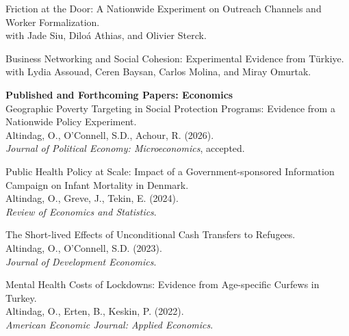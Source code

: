 \documentclass[12pt]{article}
\newcommand{\papertitle}[1]{#1} %
\begin{document}
\smallskip
\noindent\begin{minipage}{\linewidth}
\papertitle{Friction at the Door: A Nationwide Experiment on Outreach Channels and Worker Formalization.} \\
with Jade Siu, Dilo\'{a} Athias, and Olivier Sterck.
\end{minipage}

\smallskip
\noindent\begin{minipage}{\linewidth}
\papertitle{Business Networking and Social Cohesion: Experimental Evidence from T\"{u}rkiye.} \\
with Lydia Assouad, Ceren Baysan, Carlos Molina, and Miray Omurtak.
\end{minipage}

\vspace{0.5em}

\noindent\begin{minipage}{\linewidth}
\textbf{Published and Forthcoming Papers: Economics}\\[5pt]
\papertitle{Geographic Poverty Targeting in Social Protection Programs: Evidence from a Nationwide Policy Experiment.} \\
Altindag, O., O'Connell, S.D., Achour, R. (2026). \\
\textit{Journal of Political Economy: Microeconomics}, accepted.
\end{minipage}

\smallskip
\noindent\begin{minipage}{\linewidth}
\papertitle{Public Health Policy at Scale: Impact of a Government-sponsored Information Campaign on Infant Mortality in Denmark.} \\
Altindag, O., Greve, J., Tekin, E. (2024). \\
\textit{Review of Economics and Statistics}.
\end{minipage}

\smallskip
\noindent\begin{minipage}{\linewidth}
\papertitle{The Short-lived Effects of Unconditional Cash Transfers to Refugees.} \\
Altindag, O., O'Connell, S.D. (2023). \\
\textit{Journal of Development Economics}.
\end{minipage}

\smallskip
\noindent\begin{minipage}{\linewidth}
\papertitle{Mental Health Costs of Lockdowns: Evidence from Age-specific Curfews in Turkey.} \\
Altindag, O., Erten, B., Keskin, P. (2022). \\
\textit{American Economic Journal: Applied Economics}.
\end{minipage}
\end{document}
